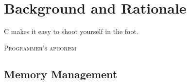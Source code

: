%
%
\chapter{Background and Rationale}\label{ch:background}


\epigraph{ C makes it easy to shoot yourself in the foot. }%
         { \textsc{Programmer's aphorism} }


\section{Memory Management}\label{sec:gc}


